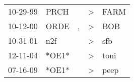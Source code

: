\begin{supertabular}{p{0.07\textwidth}p{0.06\textwidth}p{0.02\textwidth}p{0.02\textwidth}p{0.06\textwidth}}
 10-29-99\textsuperscript{} &  PRCH\textsuperscript{} &    &  \textgreater &  FARM\textsuperscript{} \\
 10-12-00\textsuperscript{} &  ORDE\textsuperscript{} &  , &  \textgreater &   BOB\textsuperscript{} \\
 10-31-01\textsuperscript{} &   n2f\textsuperscript{} &    &  \textgreater &   sfb\textsuperscript{} \\
 12-11-04\textsuperscript{} &                   *OE1* &    &  \textgreater &  toni\textsuperscript{} \\
 07-16-09\textsuperscript{} &                   *OE1* &    &  \textgreater &  peep\textsuperscript{} \\
\end{supertabular}
